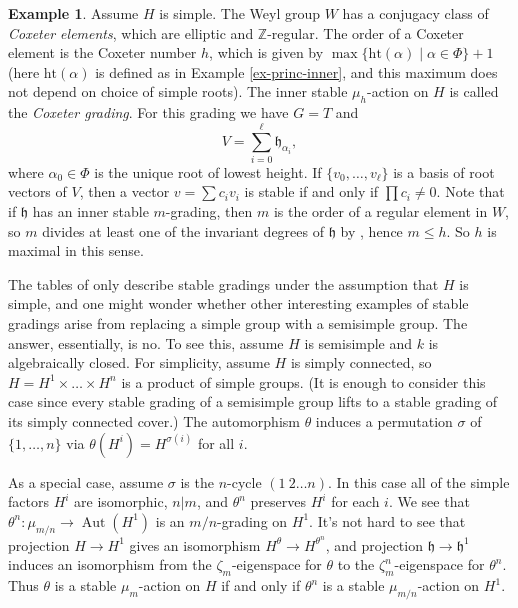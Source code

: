 \documentclass{article} %
\numberwithin{equation}{section}
\theoremstyle{definition}
\newtheorem{example}[proposition]{Example}
\DeclareMathOperator{\Aut}{Aut}
\newcommand{\height}{\mathrm{ht}}
\newcommand{\frakh}{\mathfrak h}
\newcommand{\al}{\alpha}
\newcommand{\bZ}{\mathbb Z}
\begin{document}
\begin{example}\label{ex-cox}
Assume $H$ is simple. The Weyl group $W$ has a conjugacy class of \textit{Coxeter elements}, which are elliptic and $\bZ$-regular. The order of a Coxeter element is the Coxeter number $h$, which is given by $\max\{\height(\al) \mid \al \in \Phi\} + 1$ (here $\height(\al)$ is defined as in Example \ref{ex-princ-inner}, and this maximum does not depend on choice of simple roots). 
The inner stable $\mu_h$-action on $H$ is called the \textit{Coxeter grading}. For this grading we have 
$G = T$ and
\begin{equation*}
V = \sum_{i = 0}^\ell \frakh_{\al_i},
\end{equation*}
where $\al_0 \in \Phi$ is the unique root of lowest height. 
If $\{v_0, \dots, v_\ell \}$ is a basis of root vectors of $V$, then a vector $v = \sum c_iv_i$ is stable if and only if $\prod c_i \neq 0$. 
Note that if $\frakh$ has an inner stable $m$-grading, then $m$ is the order of a regular element in $W$, so $m$ divides at least one of the invariant degrees of $\frakh$ by \cite[Theorem 4.2(i)-(ii)]{Springer}, hence $m\leq h$.
So $h$ is maximal in this sense.
\end{example}


The tables of \cite{GrossLevyReederYu-GradingsPosRank} only describe stable gradings under the assumption that $H$ is simple, and one might wonder whether other interesting examples of stable gradings arise from replacing a simple group with a semisimple group. The answer, essentially, is no. To see this, assume $H$ is semisimple and $k$ is algebraically closed. For simplicity, assume $H$ is simply connected, so $H = H^1 \times \dots \times H^n$ is a product of simple groups. (It is enough to consider this case since every stable grading of a semisimple group lifts to a stable grading of its simply connected cover.) The automorphism $\theta$ induces a permutation $\sigma$ of $\{1, \dots, n\}$ via $\theta(H^i) = H^{\sigma(i)}$ for all $i$. 

As a special case, assume $\sigma$ is the $n$-cycle $(1~2\dots n)$. 
In this case all of the simple factors $H^i$ are isomorphic, $n \vert m$, and $\theta^n$ preserves $H^i$ for each $i$. We see that $\theta^n: \mu_{m/n} \to \Aut(H^1)$ is an $m/n$-grading on $H^1$. It's not hard to see that projection $H \to H^1$ gives an isomorphism $H^\theta \to H^{\theta^n}$, and projection $\frakh \to \frakh^1$ induces an isomorphism from the $\zeta_m$-eigenspace for $\theta$ to the $\zeta_m^n$-eigenspace for $\theta^n$. Thus $\theta$ is a stable $\mu_m$-action on $H$ if and only if $\theta^n$ is a stable $\mu_{m/n}$-action on $H^1$.
\end{document}
